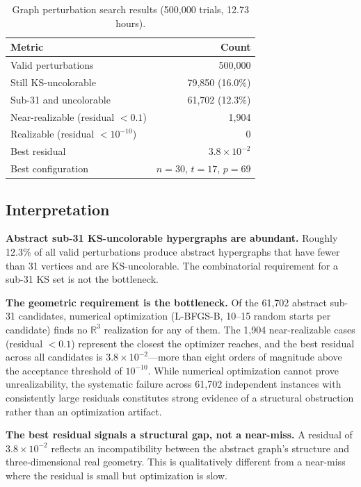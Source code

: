 \documentclass[twocolumn,pra,superscriptaddress,nofootinbib]{revtex4-2}
\newcommand{\R}{\mathbb{R}}
\begin{document}
\begin{table}[t]
\centering
\caption{Graph perturbation search results (500,000 trials, 12.73 hours).}
\label{tab:perturbation}
\begin{tabular}{lr}
\toprule
Metric & Count \\
\midrule
Valid perturbations & 500,000 \\
Still KS-uncolorable & 79,850 (16.0\%) \\
Sub-31 and uncolorable & 61,702 (12.3\%) \\
Near-realizable (residual $< 0.1$) & 1,904 \\
Realizable (residual $< 10^{-10}$) & 0 \\
Best residual & $3.8\times 10^{-2}$ \\
Best configuration & $n=30$, $t=17$, $p=69$ \\
\bottomrule
\end{tabular}
\end{table}

\subsection{Interpretation}

\textbf{Abstract sub-31 KS-uncolorable hypergraphs are abundant.} Roughly 12.3\% of all valid perturbations produce abstract hypergraphs that have fewer than 31 vertices and are KS-uncolorable. The combinatorial requirement for a sub-31 KS set is not the bottleneck.

\textbf{The geometric requirement is the bottleneck.} Of the 61,702 abstract sub-31 candidates, numerical optimization (L-BFGS-B, 10--15 random starts per candidate) finds no $\R^3$ realization for any of them. The 1,904 near-realizable cases (residual $< 0.1$) represent the closest the optimizer reaches, and the best residual across all candidates is $3.8\times 10^{-2}$---more than eight orders of magnitude above the acceptance threshold of $10^{-10}$. While numerical optimization cannot prove unrealizability, the systematic failure across 61,702 independent instances with consistently large residuals constitutes strong evidence of a structural obstruction rather than an optimization artifact.

\textbf{The best residual signals a structural gap, not a near-miss.} A residual of $3.8\times 10^{-2}$ reflects an incompatibility between the abstract graph's structure and three-dimensional real geometry. This is qualitatively different from a near-miss where the residual is small but optimization is slow.
\end{document}
